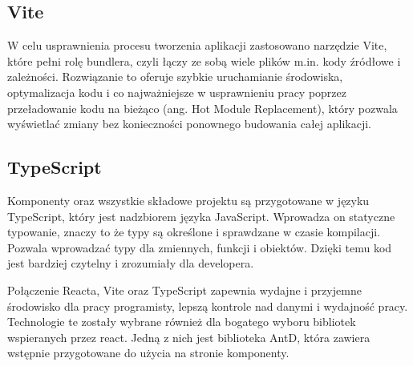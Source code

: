 \subsection*{Vite}
W celu usprawnienia procesu tworzenia aplikacji zastosowano narzędzie Vite, które pełni rolę bundlera, czyli łączy ze sobą wiele plików m.in. kody źródłowe i zależności. Rozwiązanie to oferuje szybkie uruchamianie środowiska, optymalizacja kodu i co najważniejsze w usprawnieniu pracy poprzez przeładowanie kodu na bieżąco (ang. Hot Module Replacement), który pozwala wyświetlać zmiany bez konieczności ponownego budowania całej aplikacji. 
\subsection*{TypeScript}
Komponenty oraz wszystkie składowe projektu są przygotowane w języku TypeScript, który jest nadzbiorem języka JavaScript. Wprowadza on statyczne typowanie, znaczy to że typy są określone i sprawdzane w czasie kompilacji. Pozwala wprowadzać typy dla zmiennych, funkcji i obiektów. Dzięki temu kod jest bardziej czytelny i zrozumiały dla developera. 
\newline

Połączenie Reacta, Vite oraz TypeScript zapewnia wydajne i przyjemne środowisko dla pracy programisty, lepszą kontrole nad danymi i wydajność pracy. Technologie te zostały wybrane również dla bogatego wyboru bibliotek wspieranych przez react. Jedną z nich jest biblioteka AntD, która zawiera wstępnie przygotowane do użycia na stronie komponenty. 

